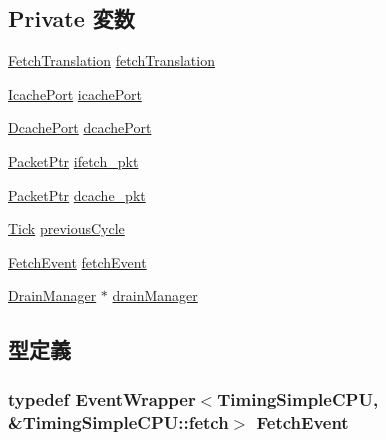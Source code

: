 \subsection*{Private 変数}
\begin{DoxyCompactItemize}
\item 
\hyperlink{classTimingSimpleCPU_1_1FetchTranslation}{FetchTranslation} \hyperlink{classTimingSimpleCPU_abc9a320383d8f8241113fe01f333d5ca}{fetchTranslation}
\item 
\hyperlink{classTimingSimpleCPU_1_1IcachePort}{IcachePort} \hyperlink{classTimingSimpleCPU_a290723656a84b9cc90dfce377af9aad0}{icachePort}
\item 
\hyperlink{classTimingSimpleCPU_1_1DcachePort}{DcachePort} \hyperlink{classTimingSimpleCPU_a38b03978ad7720fdc910ff6a8b44585f}{dcachePort}
\item 
\hyperlink{classPacket}{PacketPtr} \hyperlink{classTimingSimpleCPU_a82097539e30887f0ad11d7a218c5bcca}{ifetch\_\-pkt}
\item 
\hyperlink{classPacket}{PacketPtr} \hyperlink{classTimingSimpleCPU_a8cdf6dfb358a155d5422c09f961297fe}{dcache\_\-pkt}
\item 
\hyperlink{base_2types_8hh_a5c8ed81b7d238c9083e1037ba6d61643}{Tick} \hyperlink{classTimingSimpleCPU_acb8e08ce453c8db11437d6cf9b0167bf}{previousCycle}
\item 
\hyperlink{classEventWrapper}{FetchEvent} \hyperlink{classTimingSimpleCPU_a17e7c383c8fb3d4dc450d79c15dd1061}{fetchEvent}
\item 
\hyperlink{classDrainManager}{DrainManager} $\ast$ \hyperlink{classTimingSimpleCPU_a329b71fb934a93312ca0aacbf5a3f982}{drainManager}
\end{DoxyCompactItemize}


\subsection{型定義}
\hypertarget{classTimingSimpleCPU_a270bc6f239eb2eb58adf45357010a894}{
\subsubsection[{FetchEvent}]{\setlength{\rightskip}{0pt plus 5cm}typedef {\bf EventWrapper}$<${\bf TimingSimpleCPU}, \&TimingSimpleCPU::fetch$>$ {\bf FetchEvent}}}
\label{classTimingSimpleCPU_a270bc6f239eb2eb58adf45357010a894}


